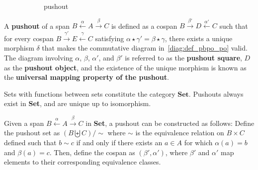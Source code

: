 \begin{definition}
    \begin{figure}[htbp] 
        \center
        \begin{subfigure}[b]{0.38 \textwidth}
            \center
            \caption{pushout}
            \label{diag:def_pbpo_po}
        \end{subfigure}
        \caption{}
        \label{fig:def_pb_po}
    \end{figure}
    A \textbf{pushout} of a span \( B \overset{\alpha}{\leftarrow} A \overset{\beta}{\rightarrow} C \) is defined as a cospan \( B \overset{\beta'}{\rightarrow} D \overset{\alpha'}{\leftarrow} C \) such that for every cospan \( B \overset{\gamma'}{\rightarrow} E \overset{\gamma}{\leftarrow} C \) satisfying \(\alpha \mathop{\star} \gamma' \mathop{=} \beta \mathop{\star} \gamma\), there exists a unique morphism \(\delta\) that makes the commutative diagram in~\autoref{diag:def_pbpo_po} valid. The diagram involving \(\alpha\), \(\beta\), \(\alpha'\), and \(\beta'\) is referred to as the \textbf{pushout square}, \(D\) as the \textbf{pushout object}, and the existence of the unique morphism is known as the \textbf{universal mapping property of the pushout}.
\end{definition}

Sets with functions between sets constitute the category \(\mathbf{Set}\). Pushouts always exist in \textbf{Set}, and are unique up to isomorphism.

\begin{example}
    Given a span \( B \overset{\alpha}{\leftarrow} A \overset{\beta}{\rightarrow} C \) in \textbf{Set}, a pushout can be constructed as follows:
    Define the pushout set as
    \(
     (B \biguplus C) / \sim
    \)
    where \(\sim\) is the equivalence relation on \(B \mathop{\times} C\) defined such that \( b \sim c \) if and only if there exists an \(a \mathop{\in} A\) for which \(\alpha(a) \mathop{=} b\) and \(\beta(a) \mathop{=} c\). Then, define the cospan as \( (\beta',\alpha') \), where \(\beta'\) and \(\alpha'\) map elements to their corresponding equivalence classes.
\end{example}
